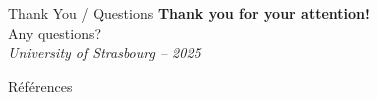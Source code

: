 \documentclass{beamer}
\begin{document}
\begin{frame}{Thank You / Questions}
\centering
\Huge \textbf{Thank you for your attention!} \\
\vspace{1cm}
\Large Any questions? \\
\vspace{0.5cm}
\textit{University of Strasbourg – 2025}
\end{frame}







\begin{frame}[allowframebreaks]{Références}
  \nocite{*}
  
  
\end{frame}
\end{document}
